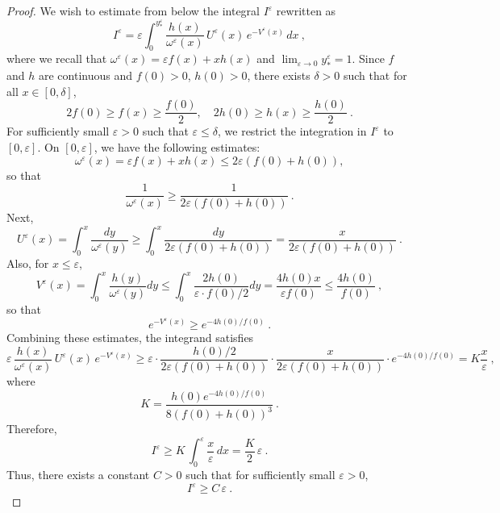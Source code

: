 \documentclass[reqno, 12pt, a4paper]{amsart}
\theoremstyle{plain}
\theoremstyle{definition}
\begin{document}
\begin{proof}
We wish to estimate from below the integral $I^\varepsilon$ rewritten as 
\begin{equation}
I^\varepsilon = \varepsilon \int_0^{y_*^\varepsilon} \frac{h(x)}{\omega^\varepsilon(x)} \,  U^\varepsilon(x) \,   e^{-V^\varepsilon(x)}\,   dx \ ,
\end{equation}
where we recall that $\omega^\varepsilon(x) = \varepsilon f(x) + x h(x)$ and $\lim_{\varepsilon \to 0} y_*^\varepsilon =1$.
Since $f$ and $h$ are continuous and $f(0) > 0$, $h(0) > 0$, there exists $\delta > 0$ such that for all $x \in [0,\delta]$,
\begin{equation}
2 f(0) \ge f(x) \ge \frac{f(0)}{2}, \quad 2 h(0) \ge h(x) \ge \frac{h(0)}{2} \ .
\end{equation}
For sufficiently small $\varepsilon > 0$ such that $\varepsilon \leq \delta$, we restrict the integration in $I^\varepsilon$ to $[0, \varepsilon]$. On $[0, \varepsilon]$, we have the following estimates:
\begin{equation}
\omega^\varepsilon(x) = \varepsilon f(x) + x h(x) \le 2\varepsilon (f(0) + h(0)),
\end{equation}
so that
\begin{equation}
\frac{1}{\omega^\varepsilon(x)} \geq \frac{1}{2\varepsilon (f(0) + h(0))} \ .
\end{equation}
Next,
\begin{equation}
U^\varepsilon(x) = \int_0^x \frac{dy}{\omega^\varepsilon(y)} \geq \int_0^x \frac{dy}{2\varepsilon (f(0) + h(0))} = \frac{x}{2\varepsilon (f(0) + h(0))} \ .
\end{equation}
Also, for $x\le \varepsilon$, 
\begin{equation}
V^\varepsilon(x) = \int_0^x \frac{h(y)}{\omega^\varepsilon(y)}  dy \leq \int_0^x \frac{2h(0)}{\varepsilon \cdot f(0)/2}  dy = \frac{4h(0) x}{\varepsilon f(0)} \leq \frac{4h(0)}{f(0)} \ ,
\end{equation}
so that
\begin{equation}
e^{-V^\varepsilon(x)} \geq e^{-4h(0)/f(0)} \ .
\end{equation}
Combining these estimates, the integrand satisfies
\begin{equation}
\varepsilon \, \frac{h(x)}{\omega^\varepsilon(x)} \,  U^\varepsilon(x)  \,  e^{-V^\varepsilon(x)} \geq \varepsilon \cdot \frac{h(0)/2}{2\varepsilon (f(0) + h(0))} \cdot \frac{x}{2\varepsilon (f(0) + h(0))} \cdot e^{-4h(0)/f(0)} = K \frac{x}{\varepsilon} \ ,
\end{equation}
where
\begin{equation}
K = \frac{h(0) e^{-4h(0)/f(0)}}{8 (f(0) + h(0))^3} \ .
\end{equation}
Therefore,
\begin{equation}
I^\varepsilon \geq K \,  \int_0^\varepsilon \frac{x}{\varepsilon} \,  dx = \frac{K}{2} \, \varepsilon  \ .
\end{equation}
Thus, there exists a constant $C>0$ such that for sufficiently small $\varepsilon > 0$, 
\begin{equation}
I^\varepsilon \geq C\,  \varepsilon \ .
\end{equation}
\end{proof}
\end{document}
